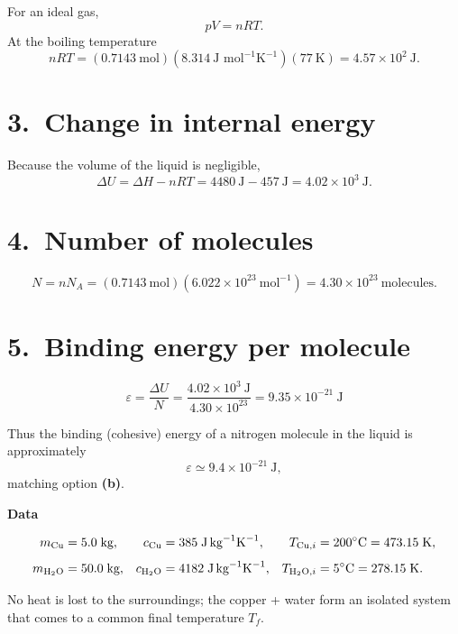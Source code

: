 \documentclass[12pt]{article}
\theoremstyle{definition} %
\theoremstyle{plain} %
\begin{document}
For an ideal gas,
\[
pV = nRT.
\]
At the boiling temperature
\[
nRT
  = (0.7143\ \text{mol})(8.314\ \text{J mol}^{-1}\text{K}^{-1})(77\ \text{K})
  = 4.57\times10^{2}\ \text{J}.
\]

\section*{3.\ Change in internal energy}

Because the volume of the liquid is negligible,
\[
\Delta U = \Delta H - nRT
         = 4480\ \text{J} - 457\ \text{J}
         = 4.02\times10^{3}\ \text{J}.
\]

\section*{4.\ Number of molecules}

\[
N = nN_A
    = (0.7143\ \text{mol})(6.022\times10^{23}\ \text{mol}^{-1})
    = 4.30\times10^{23}\ \text{molecules}.
\]

\section*{5.\ Binding energy per molecule}

\[
\boxed{
  \varepsilon
  = \frac{\Delta U}{N}
  = \frac{4.02\times10^{3}\ \text{J}}{4.30\times10^{23}}
  = 9.35\times10^{-21}\ \text{J}
}
\]

\bigskip
Thus the binding (cohesive) energy of a nitrogen molecule in the liquid
is approximately
\[
\varepsilon \simeq 9.4\times10^{-21}\ \text{J},
\]
matching option \textbf{(b)}.

\textbf{Data}

\[
\begin{aligned}
m_{\mathrm{Cu}} &= 5.0\;\text{kg}, &
c_{\mathrm{Cu}} &= 385\;\text{J\,kg}^{-1}\text{K}^{-1}, &
T_{\mathrm{Cu},i} &= 200^{\circ}\text{C}=473.15\;\text{K},\\[4pt]
m_{\mathrm{H_2O}} &= 50.0\;\text{kg}, &
c_{\mathrm{H_2O}} &= 4182\;\text{J\,kg}^{-1}\text{K}^{-1}, &
T_{\mathrm{H_2O},i} &= 5^{\circ}\text{C}=278.15\;\text{K}.
\end{aligned}
\]

No heat is lost to the surroundings; the copper + water form an isolated
system that comes to a common final temperature \(T_f\).
\end{document}
